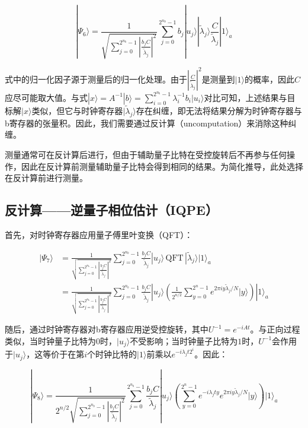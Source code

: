 \documentclass{article}
\begin{document}
\[
|\Psi_6\rangle = \frac{1}{\sqrt{\sum_{j=0}^{2^{n_b}-1} \left| \frac{b_j C}{\tilde{\lambda}_j} \right|^2}} \sum_{j=0}^{2^{n_b}-1} b_j |u_j\rangle |\tilde{\lambda}_j\rangle \frac{C}{\tilde{\lambda}_j} |1\rangle_a
\]

式中的归一化因子源于测量后的归一化处理。由于\(\left| \frac{C}{\tilde{\lambda}_j} \right|^2\)是测量到\(|1\rangle\)的概率，因此\(C\)应尽可能取大值。与式\(|x\rangle = A^{-1} |b\rangle = \sum_{i=0}^{2^{n_b}-1} \lambda_i^{-1} b_i |u_i\rangle\)对比可知，上述结果与目标解\(|x\rangle\)类似，但它与时钟寄存器\(|\tilde{\lambda}_j\rangle\)存在纠缠，即无法将结果分解为时钟寄存器与b寄存器的张量积。因此，我们需要通过反计算（uncomputation）来消除这种纠缠。

测量通常可在反计算后进行，但由于辅助量子比特在受控旋转后不再参与任何操作，因此在反计算前测量辅助量子比特会得到相同的结果。为简化推导，此处选择在反计算前进行测量。


\subsection{反计算——逆量子相位估计（IQPE）}

首先，对时钟寄存器应用量子傅里叶变换（QFT）：

\[
\begin{aligned}
|\Psi_7\rangle &= \frac{1}{\sqrt{\sum_{j=0}^{2^{n_b}-1} \left| \frac{b_j C}{\tilde{\lambda}_j} \right|^2}} \sum_{j=0}^{2^{n_b}-1} \frac{b_j C}{\tilde{\lambda}_j} |u_j\rangle \, \text{QFT} \, |\tilde{\lambda}_j\rangle |1\rangle_a \\
&= \frac{1}{\sqrt{\sum_{j=0}^{2^{n_b}-1} \left| \frac{b_j C}{\tilde{\lambda}_j} \right|^2}} \sum_{j=0}^{2^{n_b}-1} \frac{b_j C}{\tilde{\lambda}_j} |u_j\rangle \left( \frac{1}{2^{n/2}} \sum_{y=0}^{2^n - 1} e^{2\pi i y \tilde{\lambda}_j / N} |y\rangle \right) |1\rangle_a
\end{aligned}
\]

随后，通过时钟寄存器对b寄存器应用逆受控旋转，其中\(U^{-1} = e^{-iAt}\)。与正向过程类似，当时钟量子比特为\(0\)时，\(|u_j\rangle\)不受影响；当时钟量子比特为\(1\)时，\(U^{-1}\)会作用于\(|u_j\rangle\)，这等价于在第\(i\)个时钟比特的\(|1\rangle\)前乘以\(e^{-i\lambda_j t 2^i}\)。因此：

\[
|\Psi_8\rangle = \frac{1}{2^{n/2} \sqrt{\sum_{j=0}^{2^{n_b}-1} \left| \frac{b_j C}{\tilde{\lambda}_j} \right|^2}} \sum_{j=0}^{2^{n_b}-1} \frac{b_j C}{\tilde{\lambda}_j} |u_j\rangle \left( \sum_{y=0}^{2^n - 1} e^{-i\lambda_j t y} e^{2\pi i y \tilde{\lambda}_j / N} |y\rangle \right) |1\rangle_a
\]
\end{document}
